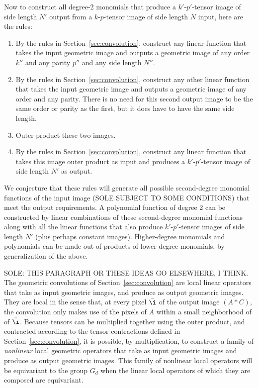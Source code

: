 \documentclass{article}
\theoremstyle{plain}
\newcommand{\sectionname}{Section}
\newcommand{\secref}[1]{\sectionname~\ref{#1}}
\begin{document}
Now to construct all degree-2 monomials that produce a $k'$-$p'$-tensor image of side length $N'$ output from a $k$-$p$-tensor image of side length $N$ input, here are the rules:
\begin{enumerate}
    \item By the rules in \secref{sec:convolution}, construct any linear function that takes the input geometric image and outputs a geometric image of any order $k''$ and any parity $p''$ and any side length $N''$.
    \item By the rules in \secref{sec:convolution}, construct any other linear function that takes the input geometric image and outputs a geometric image of any order and any parity.
    There is no need for this second output image to be the same order or parity as the first, but it does have to have the same side length.
    \item Outer product these two images.
    \item By the rules in \secref{sec:convolution}, construct any linear function that takes this image outer product as input and produces a $k'$-$p'$-tensor image of side length $N'$ as output.
\end{enumerate}
We conjecture that these rules will generate all possible second-degree monomial functions of the input image (SOLE SUBJECT TO SOME CONDITIONS) that meet the output requirements. A polynomial function of degree 2 can be constructed by linear combinations of these second-degree monomial functions along with all the linear functions that also produce $k'$-$p'$-tensor images of side length $N'$ (plus perhaps constant images).
Higher-degree monomials and polynomials can be made out of products of lower-degree monomials, by generalization of the above.

SOLE: THIS PARAGRAPH OR THESE IDEAS GO ELSEWHERE, I THINK.
The geometric convolutions of \secref{sec:convolution} are local linear operators that take as input geometric images, and produce as output geometric images.
They are local in the sense that, at every pixel $\bar\i$ of the output image $(A\ast C)$, the convolution only makes use of the pixels of $A$ within a small neighborhood of of $\bar\i$.
Because tensors can be multiplied together using the outer product, and contracted according to the tensor contractions defined in \secref{sec:convolution}, it is possible, by multiplication, to construct a family of \emph{nonlinear} local geometric operators that take as input geometric images and produce as output geometric images.
This family of nonlinear local operators will be equivariant to the group $G_d$ when the linear local operators of which they are composed are equivariant.
\end{document}

